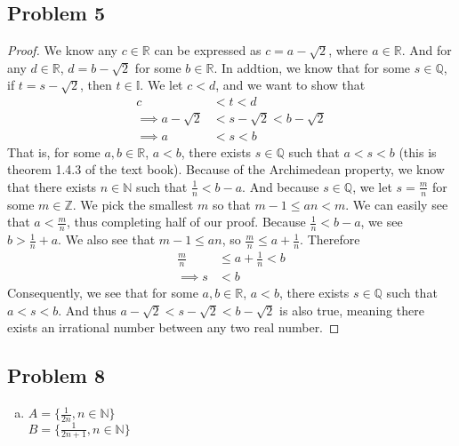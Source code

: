 \documentclass[12pt]{article}
\begin{document}
\subsection*{Problem 5}
\begin{proof}
    We know any $c \in \mathbb{R}$ can be expressed as $c = a - \sqrt{2}$, where $a \in \mathbb{R}$. 
    And for any $d \in \mathbb{R}$, $d = b - \sqrt{2}$ for some $b \in \mathbb{R}$. 
    In addtion, we know that for some $s \in \mathbb{Q}$, if $t = s - \sqrt{2}$, then $t \in \mathbb{I}$. 
    We let $ c < d$, and we want to show that
    \begin{align*}
        c &< t < d\\
        \implies a - \sqrt{2} &< s - \sqrt{2} < b - \sqrt{2}\\
        \implies a &< s < b 
    \end{align*}
    That is, for some $a,b \in \mathbb{R}$, $a < b$, there exists $s \in \mathbb{Q}$ such that $a < s < b$ (this is theorem 1.4.3 of the text book). 
    Because of the Archimedean property, we know that there exists $n \in \mathbb{N}$ such that $\frac{1}{n} < b - a$. 
    And because $s \in \mathbb{Q}$, we let $s = \frac{m}{n}$ for some $m \in \mathbb{Z}$. 
    We pick the smallest $m$ so that $m-1 \le an < m$.
    We can easily see that $a < \frac{m}{n}$, thus completing half of our proof. 
    Because $\frac{1}{n} < b - a$, we see $b > \frac{1}{n} + a$. We also see that $m - 1 \le an$, so $\frac{m}{n} \le a + \frac{1}{n}$. 
    Therefore
    \begin{align*}
        \frac{m}{n} &\le a + \frac{1}{n} < b\\
        \implies s &< b
    \end{align*}
    Consequently, we see that for some $a,b \in \mathbb{R}$, $a < b$, there exists $s \in \mathbb{Q}$ such that $a < s < b$. 
    And thus $a - \sqrt{2} < s - \sqrt{2} < b - \sqrt{2}$ is also true, meaning there exists an irrational number between any two real number. 
    
\end{proof}

\subsection*{Problem 8}
\begin{enumerate}[a).]
    \item {
    $A = \{ \frac{1}{2n}, n \in \mathbb{N}\}$\\
    $B = \{ \frac{1}{2n+1}, n \in \mathbb{N}\}$
    }
\end{enumerate}
\end{document}
